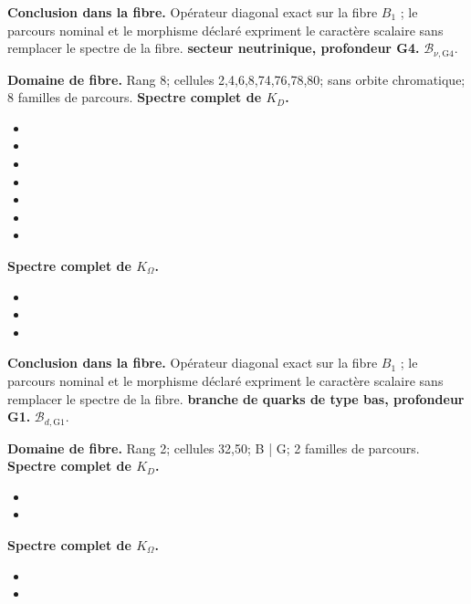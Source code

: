 \noindent\textbf{Conclusion dans la fibre.} Opérateur diagonal exact sur la fibre \(B_1\) ; le parcours nominal et le morphisme déclaré expriment le caractère scalaire sans remplacer le spectre de la fibre.
\medskip
{}
\noindent\textbf{secteur neutrinique, profondeur G4.} \(\mathcal B_{\nu,\mathrm{G4}}\).\par
\noindent\textbf{Domaine de fibre.} Rang 8; cellules 2,4,6,8,74,76,78,80; sans orbite chromatique; 8 familles de parcours.
\noindent\textbf{Spectre complet de \(K_D\).}
\begin{itemize}
\item \texttt{}
\item \texttt{}
\item \texttt{}
\item \texttt{}
\item \texttt{}
\item \texttt{}
\item \texttt{}
\end{itemize}
\noindent\textbf{Spectre complet de \(K_\Omega\).}
\begin{itemize}
\item \texttt{}
\item \texttt{}
\item \texttt{}
\end{itemize}
\noindent\textbf{Conclusion dans la fibre.} Opérateur diagonal exact sur la fibre \(B_1\) ; le parcours nominal et le morphisme déclaré expriment le caractère scalaire sans remplacer le spectre de la fibre.
\medskip
{}
\noindent\textbf{branche de quarks de type bas, profondeur G1.} \(\mathcal B_{d,\mathrm{G1}}\).\par
\noindent\textbf{Domaine de fibre.} Rang 2; cellules 32,50; B | G; 2 familles de parcours.
\noindent\textbf{Spectre complet de \(K_D\).}
\begin{itemize}
\item \texttt{}
\item \texttt{}
\end{itemize}
\noindent\textbf{Spectre complet de \(K_\Omega\).}
\begin{itemize}
\item \texttt{}
\item \texttt{}
\end{itemize}
